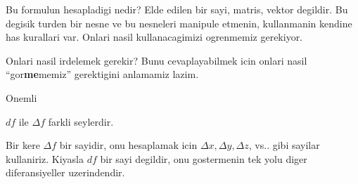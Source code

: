 \documentclass[12pt,fleqn]{article}
\begin{document}
Bu formulun hesapladigi nedir? Elde edilen bir sayi, matris, vektor
degildir. Bu degisik turden bir nesne ve bu nesneleri manipule etmenin,
kullanmanin kendine has kurallari var. Onlari nasil kullanacagimizi
ogrenmemiz gerekiyor. 

Onlari nasil irdelemek gerekir? Bunu cevaplayabilmek icin onlari nasil
``gor\textbf{me}memiz'' gerektigini anlamamiz lazim. 

Onemli

$df$ ile $\Delta f$ farkli seylerdir.

Bir kere $\Delta f$ bir sayidir, onu hesaplamak icin $\Delta x, \Delta y,
\Delta z$, vs.. gibi 
sayilar kullaniriz. Kiyasla $df$ bir sayi degildir, onu gostermenin 
tek yolu diger diferansiyeller uzerindendir. 
\end{document}
